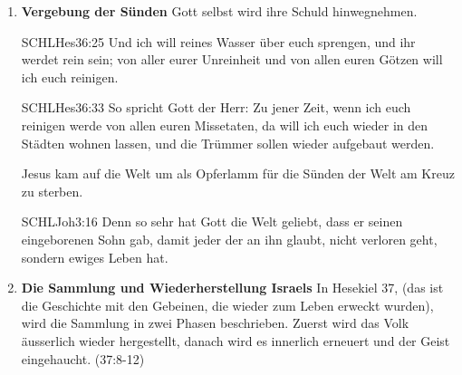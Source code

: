 \begin{otsblock}[Einführung]
\begin{enumerate}
        \begin{bibelbox}{SCHL}{Joh}{14:16}
           Und ich will den Vater bitten, und er wird euch einen anderen Beistand geben, dass er bei euch bleibt in Ewigkeit, der Geist der Wahrheit, den die Welt nicht empfangen kann, denn sie beachtet ihn nicht und erkennt ihn nicht; ihr aber erkennt ihn, denn er bleibt bei euch und wird in euch sein.
        \end{bibelbox} 
        Wir können den Heiligen Geist nur erkennen, wenn wir zuvor ein neues Herz bekommen haben. Nicht wiedergeborene Christen erkennen den Geist nicht. Darum tun sie sich so schwer mit der Bibel.
        \item \textbf{Vergebung der Sünden} Gott selbst wird ihre Schuld hinwegnehmen.
        \begin{bibelbox}{SCHL}{Hes}{36:25}
           Und ich will reines Wasser über euch sprengen, und ihr werdet rein sein; von aller eurer Unreinheit und von allen euren Götzen will ich euch reinigen.
        \end{bibelbox} 
        \begin{bibelbox}{SCHL}{Hes}{36:33}
           So spricht Gott der Herr: Zu jener Zeit, wenn ich euch reinigen werde von allen euren Missetaten, da will ich euch wieder in den Städten wohnen lassen, und die Trümmer sollen wieder aufgebaut werden.
        \end{bibelbox} 
        Jesus kam auf die Welt um als Opferlamm für die Sünden der Welt am Kreuz zu sterben.
        \begin{bibelbox}{SCHL}{Joh}{3:16}
           Denn so sehr hat Gott die Welt geliebt, dass er seinen eingeborenen Sohn gab, damit jeder der an ihn glaubt, nicht verloren geht, sondern ewiges Leben hat.
        \end{bibelbox} 
        \item \textbf{Die Sammlung und Wiederherstellung Israels} In Hesekiel 37, (das ist die Geschichte mit den Gebeinen, die wieder zum Leben erweckt wurden), wird die Sammlung in zwei Phasen beschrieben. Zuerst wird das Volk äusserlich wieder hergestellt, danach wird es innerlich erneuert und der Geist eingehaucht.
        (37:8-12)
    \end{enumerate}
\end{otsblock}

